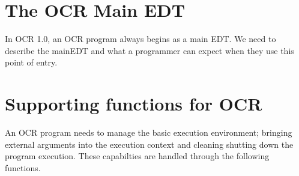 \section{The OCR Main EDT}
\label{sec:mainEDT}

In OCR 1.0, an OCR program always begins as a main EDT.   We need to describe the mainEDT and what a
programmer can expect when they use this point of entry.



\section{Supporting functions for OCR}
\label{sec:supportFuncs}

An OCR program needs to manage the basic execution environment; bringing external arguments into
the execution context and cleaning shutting down the program execution.  These capabilties are
handled through the following functions.


